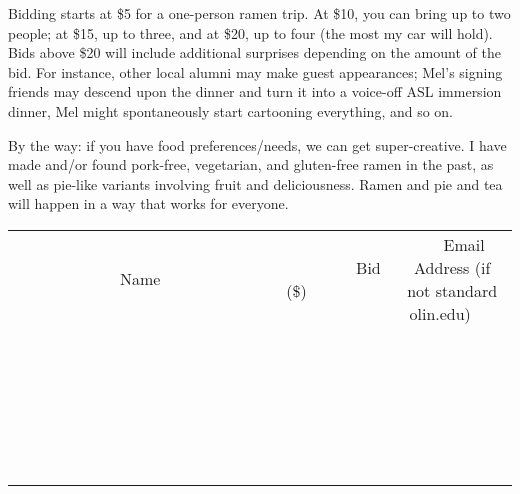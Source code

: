 \documentclass[11pt]{article}
\begin{document}
Bidding starts at \$5 for a one-person ramen trip. At \$10,  you can bring up to two people; at \$15, up to three, and at \$20, up to four (the most my car will hold). Bids above \$20 will include additional surprises depending on the amount of the bid. For instance, other local alumni may make guest appearances; Mel's signing friends may descend upon the dinner and turn it into a voice-off ASL immersion dinner, Mel might spontaneously start cartooning everything, and so on.

By the way: if you have food preferences/needs, we can get super-creative. I have made and/or found pork-free, vegetarian, and gluten-free ramen in the past, as well as pie-like variants involving fruit and deliciousness. Ramen and pie and tea will happen in a way that works for everyone.
\\[6ex]
\begin{tabular}{c c c}
~~~~~~~~~~~~~Name~~~~~~~~~~~~~ & ~~~~~~~~~Bid (\$)~~~~~~~~~  & ~~~Email Address (if not standard olin.edu)~~~\\
 & & \\
\hline
 & & \\
\hline
 & & \\
\hline
 & & \\
\hline
 & & \\
\hline
 & & \\
\hline
 & & \\
\hline
 & & \\
\hline
 & & \\
\hline
 & & \\
\hline
 & & \\
\hline
 & & \\
\hline
 & & \\
\hline
 & & \\
\hline
 & & \\
\hline
 & & \\
\hline
 & & \\
\hline
 & & \\
\hline
 & & \\
\hline
 & & \\
\hline
 & & \\
\hline
 & & \\
\hline
 & & \\
\hline
 & & \\
\hline
 & & \\
\hline
 & & \\
\hline
\end{tabular}
\newpage
\end{document}
